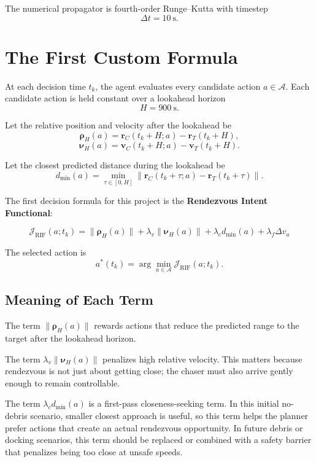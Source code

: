 \documentclass[11pt]{article}
\begin{document}
The numerical propagator is fourth-order Runge--Kutta with timestep
\[
    \Delta t = 10~\mathrm{s}.
\]

\section{The First Custom Formula}

At each decision time \(t_k\), the agent evaluates every candidate action \(a \in \mathcal A\).
Each candidate action is held constant over a lookahead horizon
\[
    H = 900~\mathrm{s}.
\]

Let the relative position and velocity after the lookahead be
\[
    \boldsymbol\rho_H(a) = \mathbf r_C(t_k + H; a) - \mathbf r_T(t_k + H),
\]
\[
    \boldsymbol\nu_H(a) = \mathbf v_C(t_k + H; a) - \mathbf v_T(t_k + H).
\]

Let the closest predicted distance during the lookahead be
\[
    d_{\min}(a)
    =
    \min_{\tau \in [0,H]}
    \left\|
    \mathbf r_C(t_k+\tau; a) - \mathbf r_T(t_k+\tau)
    \right\|.
\]

The first decision formula for this project is the \textbf{Rendezvous Intent Functional}:

\[
\boxed{
    \mathcal J_{\mathrm{RIF}}(a;t_k)
    =
    \|\boldsymbol\rho_H(a)\|
    +
    \lambda_v \|\boldsymbol\nu_H(a)\|
    +
    \lambda_c d_{\min}(a)
    +
    \lambda_f \Delta v_a
}
\]

The selected action is
\[
    a^*(t_k)
    =
    \arg\min_{a \in \mathcal A}
    \mathcal J_{\mathrm{RIF}}(a;t_k).
\]

\subsection{Meaning of Each Term}

The term \(\|\boldsymbol\rho_H(a)\|\) rewards actions that reduce the predicted range to the target after the lookahead horizon.

The term \(\lambda_v \|\boldsymbol\nu_H(a)\|\) penalizes high relative velocity.
This matters because rendezvous is not just about getting close; the chaser must also arrive gently enough to remain controllable.

The term \(\lambda_c d_{\min}(a)\) is a first-pass closeness-seeking term.
In this initial no-debris scenario, smaller closest approach is useful, so this term helps the planner prefer actions that create an actual rendezvous opportunity.
In future debris or docking scenarios, this term should be replaced or combined with a safety barrier that penalizes being too close at unsafe speeds.
\end{document}
